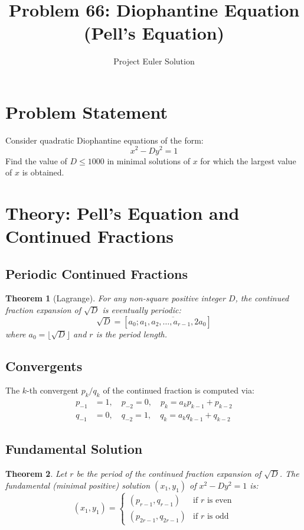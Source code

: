 \documentclass[12pt,a4paper]{article}
\title{Problem 66: Diophantine Equation (Pell's Equation)}
\author{Project Euler Solution}
\date{}
\newtheorem{theorem}{Theorem}
\begin{document}
\maketitle

\section{Problem Statement}

Consider quadratic Diophantine equations of the form:
\[
x^2 - Dy^2 = 1
\]
Find the value of $D \le 1000$ in minimal solutions of $x$ for which the largest value of $x$ is obtained.

\section{Theory: Pell's Equation and Continued Fractions}

\subsection{Periodic Continued Fractions}

\begin{theorem}[Lagrange]
For any non-square positive integer $D$, the continued fraction expansion of $\sqrt{D}$ is eventually periodic:
\[
\sqrt{D} = [a_0; \overline{a_1, a_2, \ldots, a_{r-1}, 2a_0}]
\]
where $a_0 = \lfloor \sqrt{D} \rfloor$ and $r$ is the period length.
\end{theorem}

\subsection{Convergents}

The $k$-th convergent $p_k / q_k$ of the continued fraction is computed via:
\begin{align}
p_{-1} &= 1, \quad p_{-2} = 0, \quad p_k = a_k p_{k-1} + p_{k-2} \\
q_{-1} &= 0, \quad q_{-2} = 1, \quad q_k = a_k q_{k-1} + q_{k-2}
\end{align}

\subsection{Fundamental Solution}

\begin{theorem}
Let $r$ be the period of the continued fraction expansion of $\sqrt{D}$. The fundamental (minimal positive) solution $(x_1, y_1)$ of $x^2 - Dy^2 = 1$ is:
\[
(x_1, y_1) = \begin{cases}
(p_{r-1}, q_{r-1}) & \text{if } r \text{ is even} \\
(p_{2r-1}, q_{2r-1}) & \text{if } r \text{ is odd}
\end{cases}
\]
\end{theorem}
\end{document}
